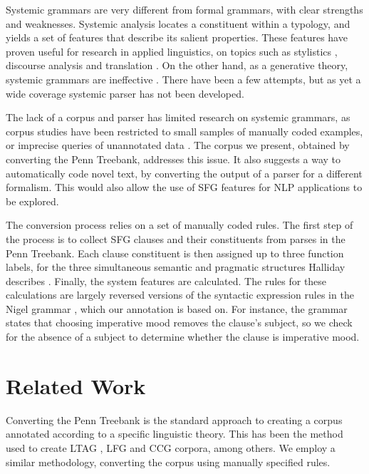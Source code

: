 \documentclass[11pt]{article}
\begin{document}
Systemic grammars are very different from formal grammars, with clear strengths and weaknesses. Systemic analysis locates a constituent within a typology, and yields a set of features that describe its salient properties. These features have proven useful for research in applied linguistics, on topics such as stylistics \citep{some sfl}, discourse analysis \citep{some more sfl} and translation \citep{more sfl}. On the other hand, as a generative theory, systemic grammars are ineffective \citep{odonnell}. There have been a few attempts, but as yet a wide coverage systemic parser has not been developed.

The lack of a corpus and parser has limited research on systemic grammars, as corpus studies have been restricted to small samples of manually coded examples, or imprecise queries of unannotated data \citep{matthiessen}. The corpus we present, obtained by converting the Penn Treebank, addresses this issue. It also suggests a way to automatically code novel text, by converting the output of a parser for a different formalism. This would also allow the use of SFG features for NLP applications to be explored.

The conversion process relies on a set of manually coded rules. The first step of the process is to collect SFG clauses and their constituents from parses in the Penn Treebank. Each clause constituent is then assigned up to three function labels, for the three simultaneous semantic and pragmatic structures Halliday describes \citep{functions}. Finally, the system features are calculated. The rules for these calculations are largely reversed versions of the syntactic expression rules in the Nigel grammar \citep{nigel}, which our annotation is based on. For instance, the grammar states that choosing imperative mood removes the clause's subject, so we check for the absence of a subject to determine whether the clause is imperative mood.


\section{Related Work}

Converting the Penn Treebank is the standard approach to creating a corpus annotated according to a specific linguistic theory. This has been the method used to create LTAG \citep{frank_ltag}, LFG \citep{frank_lfg} and CCG \citep{ccgbank} corpora, among others. We employ a similar methodology, converting the corpus using manually specified rules.
\end{document}
